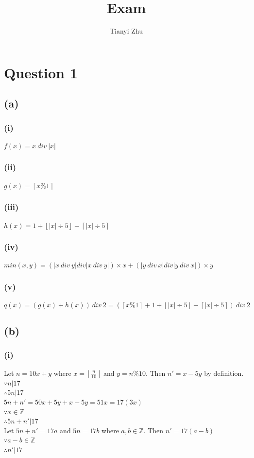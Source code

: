 \documentclass{article} %
\begin{document}
\title{Exam}
\author{Tianyi Zhu} %
\maketitle %

\section*{Question 1} %
\subsection*{(a)}
\subsubsection*{(i)}
$ f(x) = x\ div\ \left| x \right| $
\subsubsection*{(ii)}
$ g(x) = \left\lceil x \% 1 \right\rceil $
\subsubsection*{(iii)}
$ h(x) =  1 + \left\lfloor \left| x \right| \div 5 \right\rfloor - \left\lceil \left| x \right| \div 5 \right\rceil $
\subsubsection*{(iv)}
$ min(x,y) = (\left| x \ div \ y \right| div \left| x \ div \ y \right|) \times x + (\left| y \ div \ x \right| div \left| y \ div \ x \right|) \times y$
\subsubsection*{(v)}
$ q(x) = (g(x) + h(x))\ div \ 2 = (\left\lceil x \% 1 \right\rceil + 1 + \left\lfloor \left| x \right| \div 5 \right\rfloor - \left\lceil \left| x \right| \div 5 \right\rceil)\ div \ 2 $

\subsection*{(b)}
\subsubsection*{(i)}
Let $n = 10x + y$ where $x=\left\lfloor \frac{n}{10} \right\rfloor$ and $y = n \% 10$. Then $n' = x - 5y$ by definition.\\
$\because n|17$\\
$\therefore 5n|17$\\
$5n+n' = 50x+5y+x-5y = 51x = 17(3x)$\\
$\because x\in\mathbb{Z}$\\
$\therefore 5n+n'|17 $\\
Let $5n+n' = 17a$ and $5n = 17b$ where $a,b \in \mathbb{Z}$. Then $n' = 17(a-b)$\\
$\because a-b \in \mathbb{Z}$\\
$\therefore n'|17$
\end{document}
